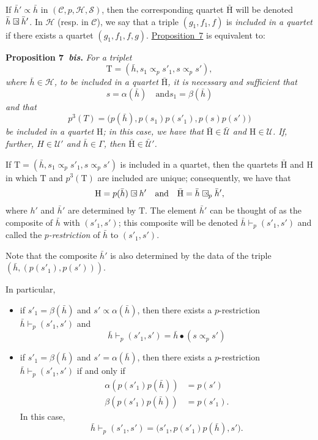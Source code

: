\documentclass[a4paper,oneside,nobib,nofonts,notitlepage,notoc,nols,fleqn,justified]{tufte-book}
\newenvironment{itenv}[1]
  {\phantomsection\par\medskip\noindent\textbf{#1.}\itshape}
  {\par\medskip}
\newcommand{\oldpage}[1]{{\reversemarginpar\marginnote{\raggedleft\footnotesize\textit{p.~#1}}}}
\newcommand{\CC}{\mathcal{C}}
\newcommand{\HH}{\mathcal{H}}
\newcommand{\rHH}{\mathrm{H}}
\renewcommand{\SS}{\mathcal{S}}
\newcommand{\UU}{\mathcal{U}}
\newcommand{\subs}{\mathrel{\propto}}
\newcommand{\sqsubs}{\mathrel{\mathrlap{\square}\raisebox{.17em}{\scaleobj{0.65}{\,\,\propto}}}}
\begin{document}
If $\bar{h}'\subs\bar{h}$ in $(\CC,p,\HH,\SS)$, then the corresponding quartet $\bar{\rHH}$ will be denoted $\bar{h}\sqsubs\bar{h}'$.
In $\HH$ (resp. in $\CC$), we say that a triple $(g_1,f_1,f)$  is \emph{included in a quartet} if there exists a quartet $(g_1,f_1,f,g)$.
\hyperref[proposition:7]{Proposition~7} is equivalent to:

\begin{itenv}{Proposition 7~\emph{bis}}
\label{proposition:7bis}
  For a triplet
  \[
    \mathrm{T}
    = (\bar{h},s_1\subs_p s'_1, s\subs_p s'),
  \]
  where $\bar{h}\in\HH$, to be included in a quartet $\bar{\rHH}$, it is necessary and sufficient that
  \[
    s=\alpha(\bar{h})
    \quad\text{and}
    s_1=\beta(\bar{h})
  \]
  and that
  \[
    p^3(T)
    = \big(
      p(\bar{h}), p(s_1)p(s'_1), p(s)p(s')
    \big)
  \]
  be included in a quartet $\rHH$;
  in this case, we have that $\bar{\rHH}\in\bar{\UU}$ and $\rHH\in\UU$.
  If, further, $H\in\UU'$ and $\bar{h}\in\Gamma$, then $\bar{\rHH}\in\bar{\UU}'$.
\end{itenv}

If $\mathrm{T}=(\bar{h},s_1\subs_p s'_1,s\subs_p s')$ is included in a quartet, then the quartets $\bar{\rHH}$ and $\rHH$ in which $\mathrm{T}$ and $p^3(\mathrm{T})$ are included are unique;
consequently, we have that
\[
  \rHH = p(\bar{h})\sqsubs h'
  \quad\text{and}\quad
  \bar{\rHH} = \bar{h}\sqsubs_p \bar{h}',
\]
\oldpage{367}
where $h'$ and $\bar{h}'$ are determined by $\mathrm{T}$.
The element $\bar{h}'$ can be thought of as the composite of $\bar{h}$ with $(s'_1,s')$;
this composite will be denoted $\bar{h}\vdash_p(s'_1,s')$ and called the \emph{$p$-restriction} of $\bar{h}$ to $(s'_1,s')$.

Note that the composite $\bar{h}'$ is also determined by the data of the triple $(\bar{h},(p(s'_1),p(s')))$.

In particular,

\begin{itemize}
  \item if $s'_1=\beta(\bar{h})$ and $s'\subs\alpha(\bar{h})$, then there exists a $p$-restriction $\bar{h}\vdash_p(s'_1,s')$ and
    \[
      \bar{h}\vdash_p(s'_1,s')
      = \bar{h}\bullet(s\subs_p s')
    \]
  \item if $s'_1=\beta(\bar{h})$ and $s'=\alpha(\bar{h})$, then there exists a $p$-restriction $\bar{h}\vdash_p(s'_1,s')$ if and only if
    \[
      \begin{aligned}
        \alpha(p(s'_1)p(\bar{h}))
        &= p(s')
      \\\beta(p(s'_1)p(\bar{h}))
        &= p(s'_1).
      \end{aligned}
    \]
    In this case,
    \[
      \bar{h}\vdash_p(s'_1,s')
      = \big(
        s'_1, p(s'_1)p(\bar{h}), s'
      \big).
    \]
\end{itemize}
\end{document}
